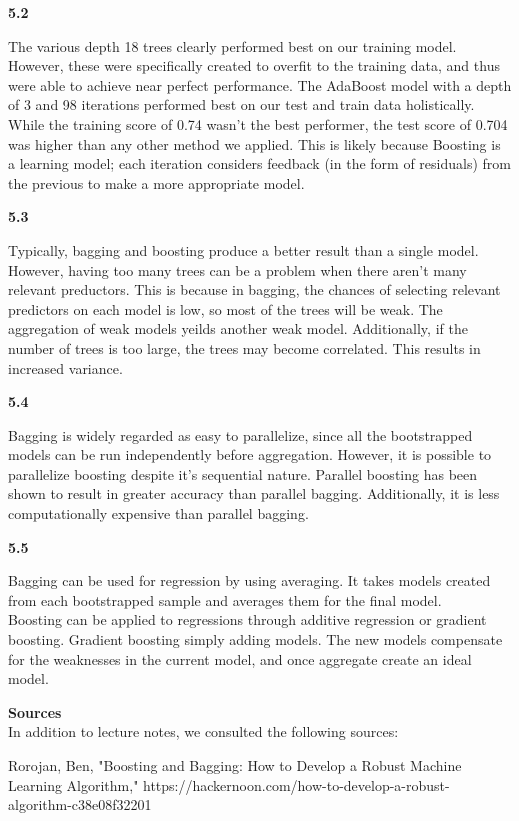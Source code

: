 \documentclass[11pt]{article}
\begin{document}
    \textbf{5.2}

    The various depth 18 trees clearly performed best on our training model.
However, these were specifically created to overfit to the training
data, and thus were able to achieve near perfect performance. The
AdaBoost model with a depth of 3 and 98 iterations performed best on our
test and train data holistically. While the training score of 0.74
wasn't the best performer, the test score of 0.704 was higher than any
other method we applied. This is likely because Boosting is a learning
model; each iteration considers feedback (in the form of residuals) from
the previous to make a more appropriate model.

    \textbf{5.3}

    Typically, bagging and boosting produce a better result than a single
model. However, having too many trees can be a problem when there aren't
many relevant preductors. This is because in bagging, the chances of
selecting relevant predictors on each model is low, so most of the trees
will be weak. The aggregation of weak models yeilds another weak model.
Additionally, if the number of trees is too large, the trees may become
correlated. This results in increased variance.

    \textbf{5.4}

    Bagging is widely regarded as easy to parallelize, since all the
bootstrapped models can be run independently before aggregation.
However, it is possible to parallelize boosting despite it's sequential
nature. Parallel boosting has been shown to result in greater accuracy
than parallel bagging. Additionally, it is less computationally
expensive than parallel bagging.

    \textbf{5.5}

    Bagging can be used for regression by using averaging. It takes models
created from each bootstrapped sample and averages them for the final
model.\\
Boosting can be applied to regressions through additive regression or
gradient boosting. Gradient boosting simply adding models. The new
models compensate for the weaknesses in the current model, and once
aggregate create an ideal model.

    \textbf{Sources}\\
In addition to lecture notes, we consulted the following sources:

Rorojan, Ben, "Boosting and Bagging: How to Develop a Robust Machine
Learning Algorithm,"
https://hackernoon.com/how-to-develop-a-robust-algorithm-c38e08f32201
\end{document}
